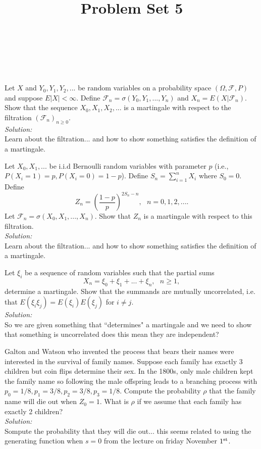 \documentclass[10pt]{amsart}
\begin{document}
\noindent
{} \\
 \\
 \\
\title{Problem Set 5}
\maketitle

 Let $X$ and $Y_0, Y_1, Y_2, . . .$ be random variables on a probability space $(\Omega, \mathcal{F},P)$ and suppose $E|X| < \infty$. Define $\mathcal{F}_n=\sigma(Y_0,Y_1,...,Y_n)$ and $X_n = E(X|\mathcal{F}_n)$. Show that the sequence $X_0, X_1, X_2,...$ is a martingale with respect to the filtration $(\mathcal{F}_n)_{n \geq 0}$. \\
\textit{Solution:} \\
Learn about the filtration... and how to show something satisfies the definition of a martingale.

\newpage

 Let $X_0, X_1, . . .$  be i.i.d Bernoulli random variables with parameter $p$ (i.e., $P(X_i = 1) = p, P(X_i = 0) =1- p$). Define $S_n = \sum_{i=1}^n X_i$ where $S_0 = 0$. Define
$$Z_n =\left(\frac{1-p}{p} \right)^{2S_n-n}, \,\,\,\, n = 0, 1, 2, . . . .$$
Let $\mathcal{F}_n = \sigma(X_0, X_1, . . . , X_n )$. Show that $Z_n$ is a martingale with respect to this filtration. \\
\textit{Solution:} \\
Learn about the filtration... and how to show something satisfies the definition of a martingale.

\newpage

 Let $\xi_i$ be a sequence of random variables such that the partial sums 
$$X_n=\xi_0+\xi_1+...+\xi_n, \,\,\,\, n\geq 1,$$
determine a martingale. Show that the summands are mutually uncorrelated, i.e. that $E(\xi_i\xi_j)=E(\xi_i)E(\xi_j)$ for $i\neq j$. \\
\textit{Solution:} \\
So we are given something that ``determines" a martingale and we need to show that something is uncorrelated does this mean they are independent?
\newpage

 Galton and Watson who invented the process that bears their names were interested in the survival of family names. Suppose each family has exactly 3 children but coin flips determine their sex. In the 1800s, only male children kept the family name so following the male offspring leads to a branching process with $p_0 = 1/8, p_1 = 3/8, p_2 = 3/8, p_3 = 1/8$. Compute the probability $\rho$ that the family name will die out when $Z_0 = 1$. What is $\rho$ if we assume that each family has exactly 2 children? \\
\textit{Solution:} \\
Sompute the probability that they will die out... this seems related to using the generating function when $s = 0$ from the lecture on friday November $1^{\rm st}$.
\newpage
\end{document}
